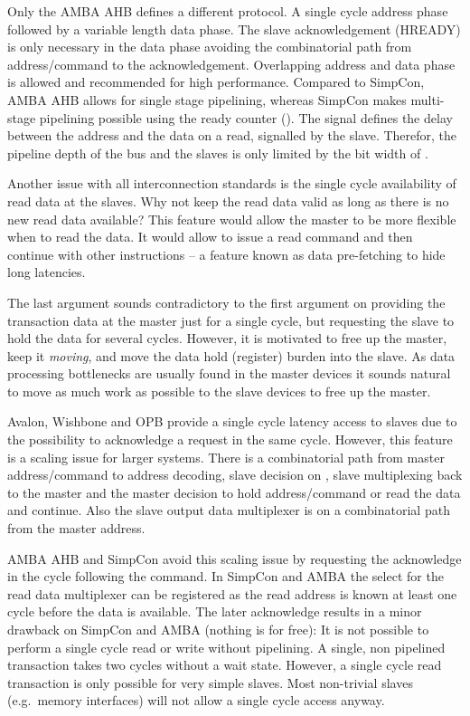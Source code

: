 Only the AMBA AHB \cite{soc:amba} defines a different protocol. A
single cycle address phase followed by a variable length data phase.
The slave acknowledgement (HREADY) is only necessary in the data
phase avoiding the combinatorial path from address/command to the
acknowledgement. Overlapping address and data phase is allowed and
recommended for high performance. Compared to SimpCon, AMBA AHB
allows for single stage pipelining, whereas SimpCon makes
multi-stage pipelining possible using the ready counter
(). The  signal defines the delay
between the address and the data on a read, signalled by the slave.
Therefor, the pipeline depth of the bus and the slaves is only
limited by the bit width of .


Another issue with all interconnection standards is the single cycle
availability of read data at the slaves. Why not keep the read data
valid as long as there is no new read data available? This feature
would allow the master to be more flexible when to read the data. It
would allow to issue a read command and then continue with other
instructions -- a feature known as data pre-fetching to hide long
latencies.

The last argument sounds contradictory to the first argument on
providing the transaction data at the master just for a single
cycle, but requesting the slave to hold the data for several cycles.
However, it is motivated to free up the master, keep it
\emph{moving}, and move the data hold (register) burden into the
slave. As data processing bottlenecks are usually found in the
master devices it sounds natural to move as much work as possible to
the slave devices to free up the master.

Avalon, Wishbone and OPB provide a single cycle latency access to
slaves due to the possibility to acknowledge a request in the same
cycle. However, this feature is a scaling issue for larger systems.
There is a combinatorial path from master address/command to address
decoding, slave decision on , slave 
multiplexing back to the master and the master decision to hold
address/command or read the data and continue. Also the slave output
data multiplexer is on a combinatorial path from the master address.

AMBA AHB and SimpCon avoid this scaling issue by requesting the
acknowledge in the cycle following the command. In SimpCon and AMBA
the select for the read data multiplexer can be registered as the
read address is known at least one cycle before the data is
available. The later acknowledge results in a minor drawback on
SimpCon and AMBA (nothing is for free): It is not possible to
perform a single cycle read or write without pipelining. A single,
non pipelined transaction takes two cycles without a wait state.
However, a single cycle read transaction is only possible for very
simple slaves. Most non-trivial slaves (e.g.\ memory interfaces)
will not allow a single cycle access anyway.

